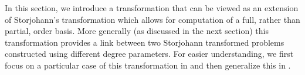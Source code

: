 \begin{comment}
\begin{itemize}
\item $\vec{e}$: uniform 0 shift used for transformation. 
\item $\vec{s}$: original input shift 
\item $\vec{t}$: output shifted degrees of the current basis, with result
from previous subproblems included. i.e., $\left[\vec{s},0,\dots,0\right]$-degrees
of the current basis. 
\item $\vec{b},\vec{a}$: input shift and output shifted degrees for each
reduced subproblem that calls OrderBasis. In the iterative computational
process, input shift $\vec{b}^{\left(i-1\right)}$ corresponds to
input shift $\vec{a}^{\left(i\right)}$. The high degree entries of
$\vec{a}^{\left(i\right)}$ at iteration $i$ is then used as the
input shift $\vec{b}^{\left(i\right)}$ for iteration $i$. 
\end{itemize}
\item dimension:

\begin{itemize}
\item $m,n$: row, column dimension 
\item $k$: number of columns with $\left[\vec{s},0,\dots,0\right]$-degrees
less than degree bound 
\item $l$: number of block rows 
\end{itemize}
\item degrees, order:

\begin{itemize}
\item $\sigma$: order 
\item $\delta$: degree bound 
\item $d$: average degree (=$m\sigma/n$) 
\end{itemize}
\end{itemize}

\end{comment}
{}

In this section, we introduce a transformation that can be viewed
as an extension of Storjohann's transformation which allows for computation
of a full, rather than partial, order basis. More generally (as discussed
in the next section) this transformation provides a link between two
Storjohann transformed problems constructed using different degree
parameters. For easier understanding, we first focus on a particular
case of this transformation in  and
then generalize this in .



